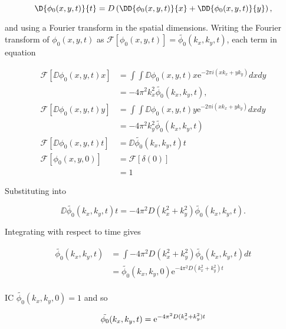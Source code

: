 \begin{equation}
  \D{\phi_0(x,y,t)}{t} = D \left( \DD{\phi_0(x,y,t)}{x}+\DD{\phi_0(x,y,t)}{y}\right),
  \label{eqn:cartesian_diffusion}
\end{equation}

and using a Fourier transform in the spatial dimensions. Writing the Fourier transform of $\phi_0(x,y,t)$ as $\mathscr{F}\left[ \phi_0(x,y,t) \right] = \tilde{\phi_0}(k_x,k_y,t)$, each term in equation

\begin{equation}
\begin{split}
  \mathscr{F}\left[ \DD{\phi_0(x,y,t)}{x} \right] &= \int \int \DD{\phi_0(x,y,t)}{x} \mathrm{e}^{-2\pi i(xk_x + yk_y)} dx dy \\
  &= -4\pi^2k_x^2 \tilde{\phi_0}(k_x,k_y,t), \\
  \mathscr{F}\left[ \DD{\phi_0(x,y,t)}{y} \right] &= \int \int \DD{\phi_0(x,y,t)}{y} \mathrm{e}^{-2\pi i(xk_x + yk_y)} dx dy \\
  &= -4\pi^2k_y^2 \tilde{\phi_0}(k_x,k_y,t) \\
  \mathscr{F}\left[\DD{\phi_0(x,y,t)}{t}\right] &= \DD{\tilde{\phi_0}(k_x,k_y,t)}{t} \\
  \mathscr{F}\left[\phi_0(x,y,0)\right] &= \mathscr{F}\left[\delta(0)\right] \\
  &= 1
\end{split}
\end{equation}


Substituting into 

\begin{equation}
  \DD{\tilde{\phi_0}(k_x,k_y,t)}{t} = -4\pi^2D (k_x^2 + k_y^2) \tilde{\phi_0}(k_x,k_y,t).
\end{equation}

Integrating with respect to time gives

\begin{equation}
\begin{split}
  \tilde{\phi_0}(k_x,k_y,t) &= \int -4\pi^2D (k_x^2 + k_y^2) \tilde{\phi_0}(k_x,k_y,t) dt \\
  &= \tilde{\phi_0}(k_x,k_y,0)\mathrm{e}^{-4\pi^2D(k_x^2 + k_y^2)t} \\
\end{split}
\end{equation}

IC $ \tilde{\phi_0}(k_x,k_y,0) = 1$ and so

\begin{equation}
  \tilde{\phi_0}(k_x,k_y,t) = \mathrm{e}^{-4\pi^2D(k_x^2 + k_y^2)t} \\
\end{equation}

